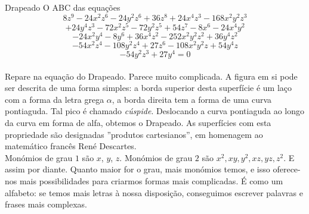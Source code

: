 \begin{surferPage}{Drapeado}
O ABC das equa\c c\~oes
  \smallskip
\[8z^9-24x^2z^6-24y^2z^6+36z^8+24x^4z^3-168x^2y^2z^3\]
\[+24y^4z^3-72x^2z^5-72y^2z^5+54z^7-8x^6-24x^4y^2\]
\[-24x^2y^4-8y^6 + 36x^4z^2-252x^2y^2z^2+36y^4z^2\]
\[- 54x^2z^4-108y^2z^4 + 27z^6-108x^2y^2z + 54y^4z\]
\[-54y^2z^3 + 27y^4 = 0\]\\
\vspace{0.1cm}
Repare na equa\c c\~ao do Drapeado. Parece muito complicada. A figura em si pode ser descrita de uma forma simples:
a borda superior desta superf\'icie \'e um la\c co com a forma da letra grega $\alpha$, a borda direita tem a forma de uma curva pontiaguda. Tal pico \'e chamado {\it c\'uspide}. Deslocando
a curva pontiaguda ao longo da curva em forma de alfa, obtemos o Drapeado. As superf\'icies com esta propriedade s\~ao
designadas  ''produtos cartesianos'', em homenagem ao matem\'atico franc\^es  Ren\'e Descartes.\\
\vspace{0.3cm}
Mon\'omios de grau $1$ s\~ao $x$, $y$, $z$. Mon\'omios de grau $2$ s\~ao $x^2, xy, y^2, xz, yz, z^2$. E assim por diante. Quanto maior for o grau, mais mon\'omios temos, e isso oferece-nos mais possibilidades para criarmos formas mais complicadas. \'E como um alfabeto: se  temos mais letras \`a nossa disposi\c c\~ao, conseguimos escrever palavras e frases mais complexas.
\end{surferPage}
